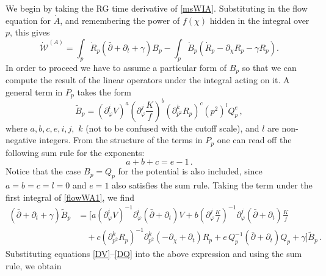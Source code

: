 \documentclass[11pt,a4paper]{article}
\numberwithin{figure}{section}
\numberwithin{equation}{section}
\begin{document}
We begin by taking the RG time derivative of \eqref{msWIA}. Substituting in the flow equation for $\dot A$, and remembering the power of $f(\chi)$ hidden in the integral over $p$, this gives
\begin{equation}
	\label{flowWA1}
	\dot{ \mathcal W } ^ {(A)} =
 	\int_p \dot R_p \left( \bar\partial + \partial_t + \gamma \right) B_p
 	- \int_p \dot B_p \left( \dot R_p - \partial_{\chi} R_p - \gamma R_p \right) .
\end{equation}
In order to proceed we have to assume a particular form of $B_p$ so that we can compute the result of the linear operators under the integral acting on it. A general term in $P_p$ takes the form
\begin{equation}
	\tilde B_p =
 	\left( \partial_{\varphi}^i V \right) ^ a
 	\left( \partial_{\varphi}^j \frac{K}{f} \right) ^ b
 	\left( \partial_{p^2}^k R_p \right) ^ c \left(p^2\right)^l Q_p^e \,,
\end{equation}
where $a,b,c,e,i,j,$ $k$ (not to be confused with the cutoff scale), and $l$ are non-negative integers. From the structure of the terms in $P_p$ one can read off the following sum rule for the exponents:
\begin{equation}
	a+b+c = e-1 \,.
\end{equation}
Notice that the case $B_p = Q_p$  for the potential is also included, since  $a=b=c=l=0$ and $e=1$ also satisfies the sum rule.
Taking the term under the first integral of \eqref{flowWA1}, we find
\begin{align}
\nonumber
	\left( \bar\partial + \partial_t + \gamma \right) \tilde B_p &=
	\bigg[a \left( \partial_{\varphi}^i V \right) ^ {-1} \partial_{\varphi}^i \left(  \bar\partial + \partial_t \right) V
	+ b \left( \partial_{\varphi}^j \frac{K}{f} \right) ^ {-1} \partial_{\varphi}^j
	 \left(  \bar\partial + \partial_t \right) \frac{K}{f} \\
	&\quad+ c \left( \partial_{p^2}^k R_p \right) ^ {-1} \partial_{p^2}^k \left( - \partial_{\chi} + \partial_t \right) R_p
	+ e \, Q_p^{-1} \left( \bar\partial + \partial_t \right) Q_p+ \gamma\bigg ] \tilde B_p \,.
\end{align}
Substituting equations \eqref{DV}--\eqref{DQ} into the above expression and using the sum rule, we obtain
\end{document}
